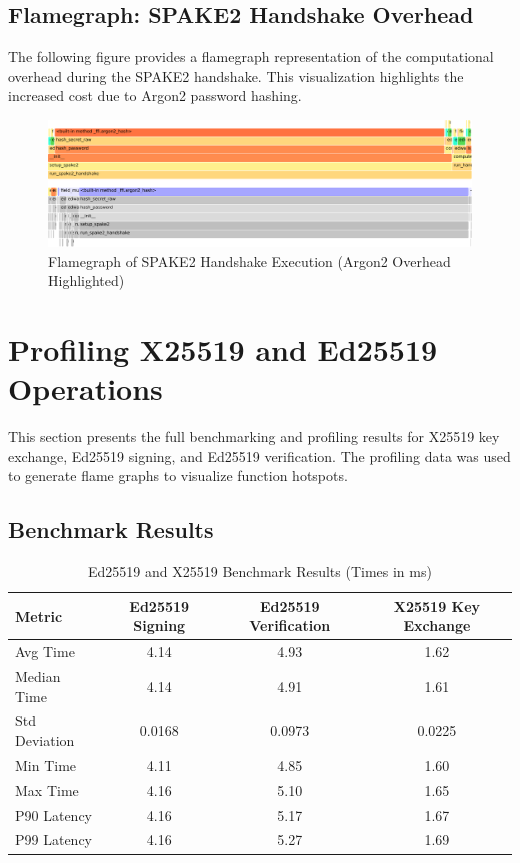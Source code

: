 \documentclass[twoside,a4paper,12pt]{article}
\begin{document}
\subsection{Flamegraph: SPAKE2 Handshake Overhead}
The following figure provides a flamegraph representation of the computational overhead during the SPAKE2 handshake. This visualization highlights the increased cost due to Argon2 password hashing.

\begin{figure}[h]
    \centering
    \includegraphics[width=0.8\linewidth]{Figs/spake2handshake.pdf} 
    \caption{Flamegraph of SPAKE2 Handshake Execution (Argon2 Overhead Highlighted)}
    \label{fig:spake2_flamegraph}
\end{figure}

\renewcommand{\thesection}{\Alph{section}}
\section{Profiling X25519 and Ed25519 Operations}
\label{sec:appendix_profiling}

This section presents the full benchmarking and profiling results for X25519 key exchange, Ed25519 signing, and Ed25519 verification. The profiling data was used to generate flame graphs to visualize function hotspots.

\subsection{Benchmark Results}

\begin{table}[h]
    \centering
    \renewcommand{\arraystretch}{1.2}
    \begin{tabular}{l c c c}
        \toprule
        \textbf{Metric} & \textbf{Ed25519 Signing} & \textbf{Ed25519 Verification} & \textbf{X25519 Key Exchange} \\
        \midrule
        Avg Time & 4.14 & 4.93 & 1.62 \\
        Median Time & 4.14 & 4.91 & 1.61 \\
        Std Deviation & 0.0168 & 0.0973 & 0.0225 \\
        Min Time & 4.11 & 4.85 & 1.60 \\
        Max Time & 4.16 & 5.10 & 1.65 \\
        P90 Latency & 4.16 & 5.17 & 1.67 \\
        P99 Latency & 4.16 & 5.27 & 1.69 \\
        \bottomrule
    \end{tabular}
    \caption{Ed25519 and X25519 Benchmark Results (Times in ms)}
    \label{tab:ed25519_x25519_benchmarks}
\end{table}
\end{document}
